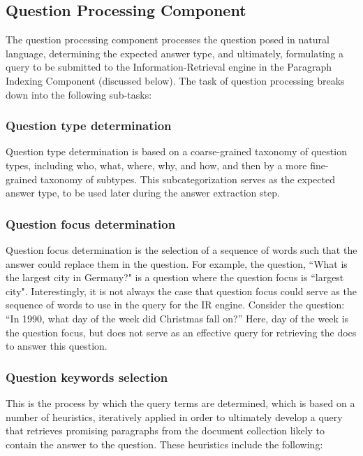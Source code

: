 \subsection{Question Processing Component}

The question processing component processes the question posed in natural language, determining the expected answer type, and ultimately, formulating a query to be submitted to the Information-Retrieval engine in the Paragraph Indexing Component (discussed below).  The task of question processing breaks down into the following sub-tasks:

\subsubsection{Question type determination}

Question type determination is based on a coarse-grained taxonomy of question types, including who, what, where, why, and how, and then by a more fine-grained taxonomy of subtypes.  This subcategorization serves as the expected answer type, to be used later during the answer extraction step.

\subsubsection{Question focus determination}

Question focus determination is the selection of a sequence of words such that the answer could replace them in the question.  For example, the question, ``What is the largest city in Germany?" is a question where the question focus is ``largest city".  Interestingly, it is not always the case that question focus could serve as the sequence of words to use in the query for the IR engine.   Consider the question: ``In 1990, what day of the week did Christmas fall on?”  Here, day of the week is the question focus, but does not serve as an effective query for retrieving the docs to answer this question.  

\subsubsection{Question keywords selection}

This is the process by which the query terms are determined, which is based on a number of heuristics, iteratively applied in order to ultimately develop a query that retrieves promising paragraphs from the document collection likely to contain the answer to the question.  These heuristics include the following:

